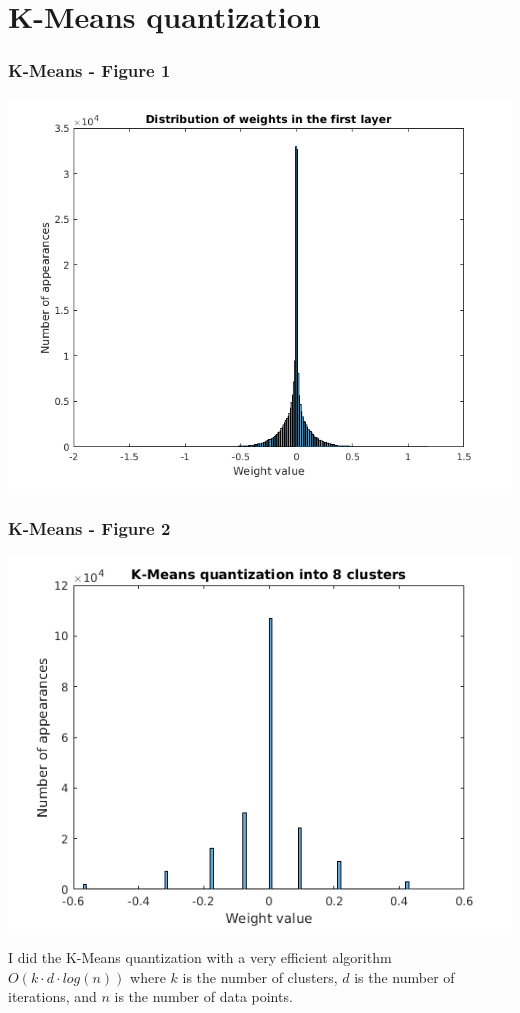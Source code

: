 \documentclass[7pt]{beamer}
\begin{document}
\begin{sloppypar}
\section{K-Means quantization}

\begin{frame}
\frametitle{K-Means - Figure 1}
\begin{justify}
\begin{center}
	\includegraphics[scale=0.4]{First-layer-Neural-nets-distribution}
\end{center}
\end{justify}
\end{frame}


\begin{frame}
\frametitle{K-Means - Figure 2}
\begin{justify}
\begin{center}
	\includegraphics[scale=0.5]{First-layer-Neural-nets-KMeans-8}
\end{center}
\end{justify}
I did the K-Means quantization with a very efficient algorithm $O(k \cdot d \cdot log(n))$ where $k$ is the number of clusters, $d$ is the number of iterations, and $n$ is the number of data points.
\end{frame}



\end{sloppypar}
\end{document}
